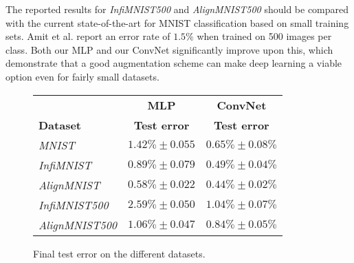 \documentclass[twoside]{article}
\begin{document}
  The reported results for \emph{InfiMNIST500} and \emph{AlignMNIST500} should be
  compared with the current state-of-the-art for MNIST classification based on
  small training sets. Amit et al. \cite{Amit:ijcv:2007} report an error rate of $1.5\%$
  when trained on 500 images per class. Both our MLP and our ConvNet significantly
  improve upon this, which demonstrate that a good augmentation scheme can make
  deep learning a viable option even for fairly small datasets.
  
  \begin{figure}
    \begin{tabular}{lcc}
                             & \textbf{MLP}           & \textbf{ConvNet} \\
      \textbf{Dataset}       & \textbf{Test error}    & \textbf{Test error} \\
      \hline
      \emph{MNIST}           & $1.42\% \pm 0.055$     & $0.65\% \pm 0.08\%$ \\ 
      \emph{InfiMNIST}       & $0.89\% \pm 0.079$     & $0.49\% \pm 0.04\%$ \\
      \emph{AlignMNIST}      & $0.58\% \pm 0.022$     & $0.44\% \pm 0.02\%$ \\ \hline
      \emph{InfiMNIST500}    & $2.59\% \pm 0.050$     & $1.04\% \pm 0.07\%$ \\
      \emph{AlignMNIST500}   & $1.06\% \pm 0.047$     & $0.84\% \pm 0.05\%$	
    \end{tabular}
    \caption{Final test error on the different datasets.}
    \label{fig:res}

\end{figure}
\end{document}
